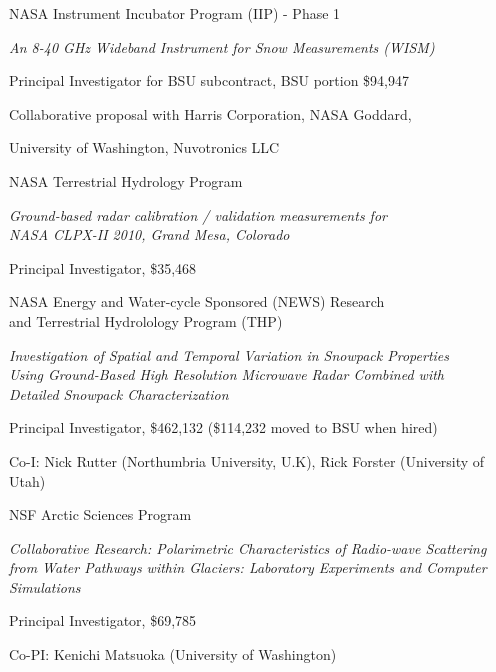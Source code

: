 \documentclass[11pt]{article}
\renewenvironment{itemize}{
  \begin{list}{}{
    \setlength{\leftmargin}{1.5em}
    \setlength{\itemsep}{0pt}
    \setlength{\parskip}{0pt}
  }
}{
  \end{list}
}
\begin{document}
\begin{itemize}
\item[11/2011-12/2014] NASA Instrument Incubator Program (IIP) - Phase 1
\begin{itemize}
\item \textit{An 8-40 GHz Wideband Instrument for Snow Measurements (WISM)}
\item Principal Investigator for BSU subcontract, BSU portion \$94,947
\item Collaborative proposal with Harris Corporation, NASA Goddard, 
\item University of Washington, Nuvotronics LLC
\end{itemize}

\item[08/2010-08/2012] NASA Terrestrial Hydrology Program
\begin{itemize}
\item \textit{Ground-based radar calibration / validation measurements for \\ NASA CLPX-II 2010, Grand Mesa, Colorado}
\item Principal Investigator, \$35,468
\end{itemize}

\item[08/2006-07/2009] NASA Energy and Water-cycle Sponsored (NEWS) Research \\
and Terrestrial Hydrolology Program (THP)
\begin{itemize}
  \item \textit{Investigation of Spatial and Temporal Variation in Snowpack Properties \\
  Using Ground-Based High Resolution Microwave Radar Combined with \\
  Detailed Snowpack Characterization}
  \item Principal Investigator, \$462,132 (\$114,232 moved to BSU when hired)
  \item Co-I: Nick Rutter (Northumbria University, U.K), Rick Forster (University of Utah)
\end{itemize}

\item[09/2005-08/2010] NSF Arctic Sciences Program
\begin{itemize}
  \item \textit{Collaborative Research: Polarimetric Characteristics of Radio-wave 
  Scattering from Water Pathways within Glaciers: Laboratory Experiments and Computer 
  Simulations}
  \item Principal Investigator, \$69,785
  \item Co-PI: Kenichi Matsuoka (University of Washington)
\end{itemize}
\end{itemize}
\end{document}
